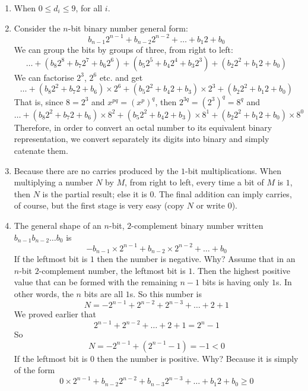 \begin{enumerate}
    The highest number is achieved when \(b_{n-1}=0\) and \(b_{n-2},
    b_{n-3}, \dots, b_0\) are \(1\): \(\text{max}_n = 2^{n-2} +
    2^{n-3} + \dots + 1 = 2^{n-1} - 1\).

    The total number of numbers that can be represented is thus
    \[
     \text{max}_n - \text{min}_n + 1 = 2^{n-1} - 1 + 2^{n-1} + 1 = 2^{n}
    \]
    This is, of course, the same number as with the (unsigned) binary
    numbers.

  \item When \(0 \leqslant d_i \leqslant 9\), for all \(i\).

  \item Consider the \(n\)-bit binary number general form:
    \[
     b_{n-1} 2^{n-1} + b_{n-2} 2^{n-2} + \dots + b_1 2 + b_0
    \]
    We can group the bits by groups of three, from right to left:
    \[
     \dots + (b_8 2^8 + b_7 2^7 + b_6 2^6) + (b_5 2^5 + b_4 2^4 + b_3 2^3)
     + (b_2 2^2 + b_1 2 + b_0)
    \]
    We can factorise \(2^3\), \(2^6\) etc. and get
    \[
     \dots + (b_8 2^2 + b_7 2 + b_6) \times 2^6 + (b_5 2^2 + b_4 2 + b_3)
     \times 2^3 + (b_2 2^2 + b_1 2 + b_0)
    \]
    That is, since \(8 = 2^3\) and \(x^{pq} = (x^p)^q\), then \(2^{3q}
    = (2^3)^q = 8^q\) and
    \[
     \dots + (b_8 2^2 + b_7 2 + b_6) \times 8^2 + (b_5 2^2 + b_4 2 + b_3)
     \times 8^1 + (b_2 2^2 + b_1 2 + b_0) \times 8^0
    \]
    Therefore, in order to convert an octal number to its equivalent
    binary representation, we convert separately its digits into
    binary and simply catenate them.

  \item Because there are no carries produced by the \(1\)-bit
    multiplications. When multiplying a number \(N\) by \(M\), from
    right to left, every time a bit of \(M\) is \(1\), then \(N\) is
    the partial result; else it is \(0\). The final addition can imply
    carries, of course, but the first stage is very easy (copy \(N\)
    or write \(0\)).

  \item The general shape of an \(n\)-bit, \(2\)-complement binary
    number written \( b_{n-1}b_{n-2}\dots{b_0}\) is
    \[
     -b_{n-1} \times 2^{n-1} + b_{n-2} \times 2^{n-2} + \dots + b_0
    \]
    If the leftmost bit is \(1\) then the number is negative. Why?
    Assume that in an \(n\)-bit \(2\)-complement number, the leftmost
    bit is \(1\). Then the highest positive value that can be formed
    with the remaining \(n-1\) bits is having only \(1\)s. In other
    words, the \(n\) bits are all \(1\)s. So this number is
    \[
     N = -2^{n-1} + 2^{n-2} + 2^{n-3} + \dots + 2 + 1
    \]
    We proved earlier that
    \[
    2^{n-1} + 2^{n-2} + \dots + 2 + 1 = 2^n - 1
    \]
    So
    \[
    N = -2^{n-1} + (2^{n-1} - 1) = -1 < 0
    \]
    If the leftmost bit is \(0\) then the number is positive. Why?
    Because it is simply of the form
    \[
    0 \times 2^{n-1} + b_{n-2} 2^{n-2} + b_{n-3} 2^{n-3} + \dots + b_1 2 +
    b_0 \geqslant 0
    \]


\end{enumerate}
